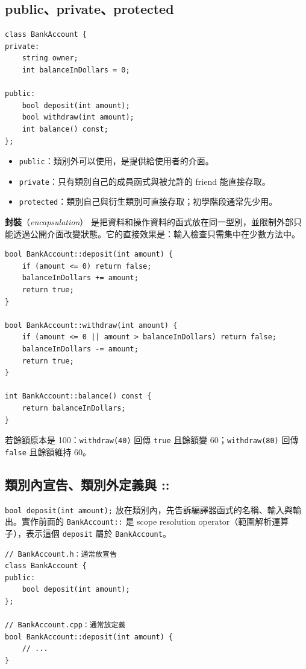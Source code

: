 \documentclass[11pt,a4paper]{article}
\newcommand{\term}[2]{\textbf{#1}（\textit{#2}）}
\newcommand{\code}[1]{\texttt{#1}}
\begin{document}
\subsection{public、private、protected}

\begin{lstlisting}
class BankAccount {
private:
    string owner;
    int balanceInDollars = 0;

public:
    bool deposit(int amount);
    bool withdraw(int amount);
    int balance() const;
};
\end{lstlisting}

\begin{itemize}
  \item \code{public}：類別外可以使用，是提供給使用者的介面。
  \item \code{private}：只有類別自己的成員函式與被允許的 friend 能直接存取。
  \item \code{protected}：類別自己與衍生類別可直接存取；初學階段通常先少用。
\end{itemize}

\term{封裝}{encapsulation} 是把資料和操作資料的函式放在同一型別，並限制外部只能透過公開介面改變狀態。它的直接效果是：輸入檢查只需集中在少數方法中。

\begin{lstlisting}
bool BankAccount::deposit(int amount) {
    if (amount <= 0) return false;
    balanceInDollars += amount;
    return true;
}

bool BankAccount::withdraw(int amount) {
    if (amount <= 0 || amount > balanceInDollars) return false;
    balanceInDollars -= amount;
    return true;
}

int BankAccount::balance() const {
    return balanceInDollars;
}
\end{lstlisting}

若餘額原本是 100：\code{withdraw(40)} 回傳 \code{true} 且餘額變 60；\code{withdraw(80)} 回傳 \code{false} 且餘額維持 60。

\subsection{類別內宣告、類別外定義與 ::}

\code{bool deposit(int amount);} 放在類別內，先告訴編譯器函式的名稱、輸入與輸出。實作前面的 \code{BankAccount::} 是 scope resolution operator（範圍解析運算子），表示這個 \code{deposit} 屬於 \code{BankAccount}。

\begin{lstlisting}
// BankAccount.h：通常放宣告
class BankAccount {
public:
    bool deposit(int amount);
};

// BankAccount.cpp：通常放定義
bool BankAccount::deposit(int amount) {
    // ...
}
\end{lstlisting}
\end{document}
